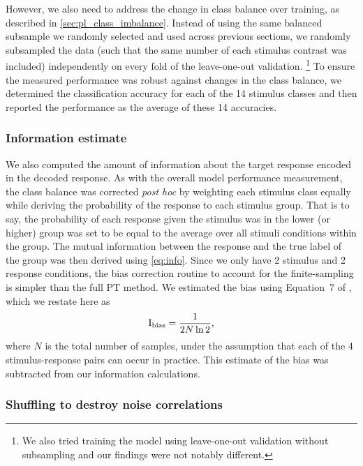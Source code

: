 However, we also need to address the change in class balance over training, as described in \autoref{sec:pl_class_imbalance}.
Instead of using the same balanced subsample we randomly selected and used across previous sections, we randomly subsampled the data (such that the same number of each stimulus contrast was included) independently on every fold of the leave-one-out validation.%
\footnote{We also tried training the model using leave-one-out validation without subsampling and our findings were not notably different.}
To ensure the measured performance was robust against changes in the class balance, we determined the classification accuracy for each of the \num{14} stimulus classes and then reported the performance as the average of these \num{14} accuracies.


\subsubsection{Information estimate}
\label{sec:pl_decode_info}

We also computed the amount of information about the target response encoded in the decoded response.
As with the overall model performance measurement, the class balance was corrected \textit{post hoc} by weighting each stimulus class equally while deriving the probability of the response to each stimulus group.
That is to say, the probability of each response given the stimulus was in the lower (or higher) group was set to be equal to the average over all stimuli conditions within the group.
The mutual information between the response and the true label of the group was then derived using \autoref{eq:info}.
Since we only have \num{2} stimulus and \num{2} response conditions, the bias correction routine to account for the finite-sampling is simpler than the full \ac{PT} method.
We estimated the bias using Equation~7 of \citet{Panzeri1996}, which we restate here as
\begin{equation}
\operatorname{I}_\text{bias} = \frac{1}{2 N \ln 2}
,\end{equation}
where $N$ is the total number of samples, under the assumption that each of the \num{4} stimulus-response pairs can occur in practice.
This estimate of the bias was subtracted from our information calculations.


\subsubsection{Shuffling to destroy noise correlations}
\label{sec:pl_dec_shuffle}

